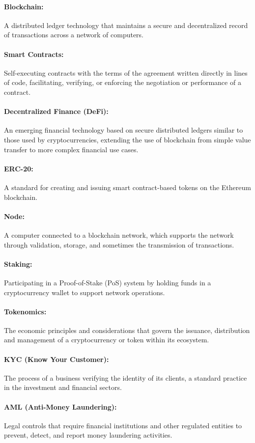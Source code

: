 \documentclass{article}
\begin{document}
\paragraph{Blockchain:} A distributed ledger technology that maintains a secure and decentralized record of transactions across a network of computers.

\paragraph{Smart Contracts:} Self-executing contracts with the terms of the agreement written directly in lines of code, facilitating, verifying, or enforcing the negotiation or performance of a contract.

\paragraph{Decentralized Finance (DeFi):} An emerging financial technology based on secure distributed ledgers similar to those used by cryptocurrencies, extending the use of blockchain from simple value transfer to more complex financial use cases.

\paragraph{ERC-20:} A standard for creating and issuing smart contract-based tokens on the Ethereum blockchain.

\paragraph{Node:} A computer connected to a blockchain network, which supports the network through validation, storage, and sometimes the transmission of transactions.

\paragraph{Staking:} Participating in a Proof-of-Stake (PoS) system by holding funds in a cryptocurrency wallet to support network operations.

\paragraph{Tokenomics:} The economic principles and considerations that govern the issuance, distribution and management of a cryptocurrency or token within its ecosystem.

\paragraph{KYC (Know Your Customer):} The process of a business verifying the identity of its clients, a standard practice in the investment and financial sectors.

\paragraph{AML (Anti-Money Laundering):} Legal controls that require financial institutions and other regulated entities to prevent, detect, and report money laundering activities.
\end{document}
